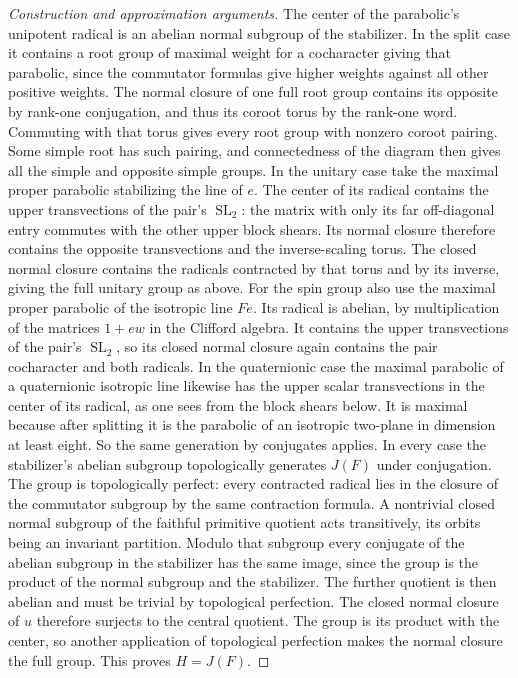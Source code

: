 \documentclass[11pt,a4paper,openany,oneside]{book}
\theoremstyle{resultstyle}
\theoremstyle{definition}
\numberwithin{equation}{chapter}
\begin{document}
\begin{proof}[Construction and approximation arguments]
The center of the parabolic's unipotent radical is
an abelian normal subgroup of the stabilizer. In the
split case it contains a root group of maximal weight
for a cocharacter giving that parabolic, since the
commutator formulas give higher weights against all
other positive weights. The normal closure of one
full root group contains its opposite by rank-one
conjugation, and thus its coroot torus by the rank-one
word. Commuting with that torus gives every root group
with nonzero coroot pairing. Some simple root has such
pairing, and connectedness of the diagram then gives
all the simple and opposite simple groups.
In the unitary case take the maximal proper parabolic
stabilizing the line of \(e\). The center of its
radical contains the upper transvections of the
pair's \(\operatorname{SL}_2\): the matrix with only
its far off-diagonal entry commutes with the other
upper block shears. Its normal closure therefore
contains the opposite transvections and the
inverse-scaling torus. The closed normal closure
contains the radicals contracted by that torus
and by its inverse, giving the full unitary group
as above. For the spin group also use the maximal
proper parabolic of the isotropic line \(Fe\).
Its radical is abelian, by multiplication of
the matrices \(1+ew\) in the Clifford algebra.
It contains the upper transvections of the pair's
\(\operatorname{SL}_2\), so its closed normal closure
again contains the pair cocharacter and both
radicals. In the quaternionic case the
maximal parabolic of a quaternionic isotropic
line likewise has the upper scalar transvections
in the center of its radical, as one sees
from the block shears below. It is maximal
because after splitting it is the parabolic
of an isotropic two-plane in dimension at
least eight. So the same generation by
conjugates applies. In every case the stabilizer's abelian
subgroup topologically generates \(J(F)\) under
conjugation. The group is topologically perfect:
every contracted radical lies in the closure of
the commutator subgroup by the same contraction
formula. A nontrivial closed normal subgroup of the faithful
primitive quotient acts transitively, its orbits being
an invariant partition. Modulo that subgroup every
conjugate of the abelian subgroup in the stabilizer has
the same image, since the group is the product of the
normal subgroup and the stabilizer. The further quotient
is then abelian and must be trivial by topological
perfection.
The closed normal closure of \(u\) therefore surjects to the
central quotient. The group is its product with the
center, so another application of topological perfection makes
the normal closure the full group. This proves \(H=J(F)\).


\end{proof}
\end{document}
